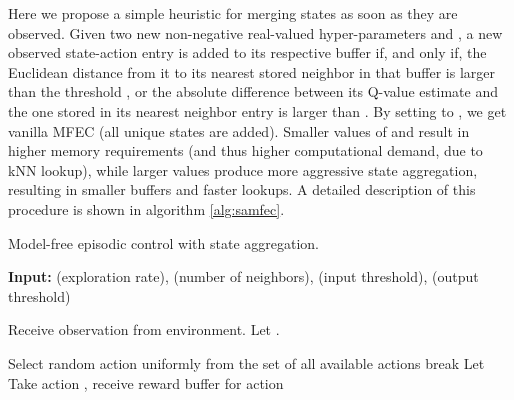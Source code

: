 \documentclass{article}
\begin{document}
Here we propose a simple heuristic for merging states as soon as they are observed. Given two new non-negative real-valued hyper-parameters  and , a new observed state-action entry is added to its respective buffer if, and only if, the Euclidean distance from it to its nearest stored neighbor in that buffer is larger than the threshold , or the absolute difference between its Q-value estimate and the one stored in its nearest neighbor entry is larger than . By setting  to , we get vanilla MFEC (all unique states are added). Smaller values of  and  result in higher memory requirements (and thus higher computational demand, due to kNN lookup), while larger values produce more aggressive state aggregation, resulting in smaller buffers and faster lookups. A detailed description of this procedure is shown in algorithm \ref{alg:samfec}.

\begin{algorithm}[htb]
\caption{Model-free episodic control with state aggregation.}
\hspace*{\algorithmicindent} \textbf{Input:}  (exploration rate),  (number of neighbors),  (input threshold),  (output threshold)
\begin{algorithmic}[1]
    \For{} 
        \State Receive observation  from environment.
        \State Let . 
        
        \If {}   
            \State Select random action  uniformly from the set of all available actions
        \Else   {}
                \If {}  
                    \State   {}
                \Else   {}
                    \State 
                        \State  {}
                        \State 
                        \If{} 
                            \State break
                        \EndIf
                    \EndFor
                    \State  {}
                \EndIf
            \EndFor
            \State Let  
        \EndIf
        \State Take action , receive reward 
    \EndFor
    \For{} 
        \State  buffer for action   
        \If {} 
            \State   {}
          
                \State  {}
                \State   {}
                \State   {}
                \State   {}
        \Else   {}
            \State   {}
            \State  {}
        \EndIf
    \EndFor
\EndFor
\end{algorithmic}
\label{alg:samfec}
\end{algorithm}
\end{document}
